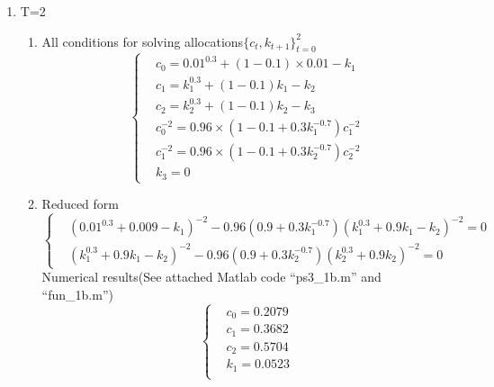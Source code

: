 \documentclass{article}
\begin{document}
\begin{enumerate}
\begin{enumerate}
\begin{enumerate}
\begin{equation*}
\begin{aligned}
                    &k_1=0.0402\\
                    &k_2=0
                    \end{aligned}
                \right.
            \end{equation*}
        \end{enumerate}
        \item T=2
        \begin{enumerate}
            \item All conditions for solving allocations$\{c_t,k_{t+1}\}_{t=0}^2$
            \begin{equation*}
                \left\{
                    \begin{aligned}
                    &c_0=0.01^{0.3}+(1-0.1)\times0.01-k_1\\
                    &c_1=k_1^{0.3}+(1-0.1)k_1-k_2\\
                    &c_2=k_2^{0.3}+(1-0.1)k_2-k_3\\
                    &c_0^{-2}=0.96\times(1-0.1+0.3k_1^{-0.7})c_1^{-2}\\
                    &c_1^{-2}=0.96\times(1-0.1+0.3k_2^{-0.7})c_2^{-2}\\
                    &k_3=0
                    \end{aligned}
                \right.
            \end{equation*}
            \item Reduced form
            \begin{equation*}
                \left\{
                    \begin{aligned}
                        &(0.01^{0.3}+0.009-k_1)^{-2}-0.96(0.9+0.3k_1^{-0.7})(k_1^{0.3}+0.9k_1-k_2)^{-2}=0\\
                        &(k_1^{0.3}+0.9k_1-k_2)^{-2}-0.96(0.9+0.3k_2^{-0.7})(k_2^{0.3}+0.9k_2)^{-2}=0
                    \end{aligned}
            \right.   
            \end{equation*}
            Numerical results(See attached Matlab code ``ps3\_1b.m'' and ``fun\_1b.m'')
            \begin{equation*}
                \left\{
                    \begin{aligned}
                    &c_0=0.2079\\
                    &c_1=0.3682\\
                    &c_2=0.5704\\
                    &k_1=0.0523\\

\end{aligned}
\end{equation*}
\end{enumerate}
\end{enumerate}
\end{enumerate}
\end{document}
